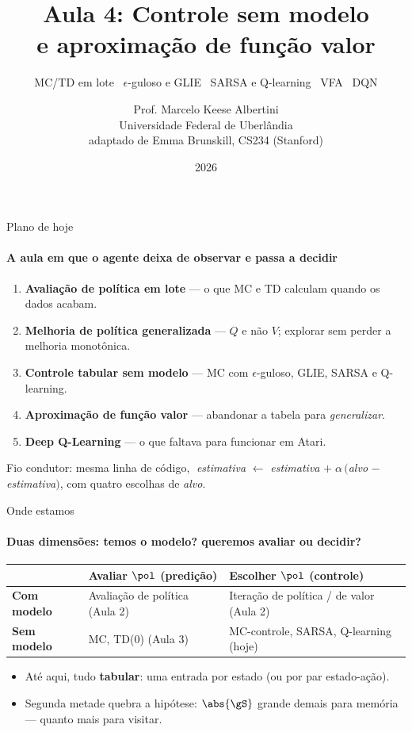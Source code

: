 \documentclass[aspectratio=169, 11pt]{beamer}
\title[Aula 4 — Controle sem modelo]{Aula 4: Controle sem modelo\\ e aproximação de função valor}
\subtitle[Aprendizagem por Reforço]{MC/TD em lote \textbullet\ $\epsilon$-guloso e GLIE \textbullet\ SARSA e Q-learning \textbullet\ VFA \textbullet\ DQN}
\author[Prof. Marcelo K. Albertini]{Prof. Marcelo Keese Albertini \\
  \footnotesize Universidade Federal de Uberlândia \\
  \footnotesize adaptado de Emma Brunskill, CS234 (Stanford)}
\institute{Universidade Federal de Uberlândia}
\date{2026}
\begin{document}
\begin{frame}\titlepage\end{frame}

\begin{frame}{Plano de hoje}
  \framesubtitle{A aula em que o agente deixa de observar e passa a decidir}

  \begin{enumerate}\setlength{\itemsep}{0.55ex}
    \item \textbf{Avaliação de política em lote} — o que MC e TD calculam
      quando os dados acabam.
    \item \textbf{Melhoria de política generalizada} — $Q$ e não $V$;
      explorar sem perder a melhoria monotônica.
    \item \textbf{Controle tabular sem modelo} — MC com $\epsilon$-guloso,
      GLIE, SARSA e Q-learning.
    \item \textbf{Aproximação de função valor} — abandonar a tabela para
      \emph{generalizar}.
    \item \textbf{Deep Q-Learning} — o que faltava para funcionar em Atari.
  \end{enumerate}

  \begin{ideiabox}
    Fio condutor: mesma linha de código,
    $\;$\emph{estimativa} $\leftarrow$ \emph{estimativa} $+\;\alpha\,($\emph{alvo} $-$ \emph{estimativa}$)$,
    com quatro escolhas de \emph{alvo}.
  \end{ideiabox}
\end{frame}

\begin{frame}{Onde estamos}
  \framesubtitle{Duas dimensões: temos o modelo? queremos avaliar ou decidir?}

  \begin{center}\small
  \begin{tabular}{lll}
    \toprule
     & \textbf{Avaliar $\pol$} (predição) & \textbf{Escolher $\pol$} (controle) \\
    \midrule
    \textbf{Com modelo} & Avaliação de política (Aula 2) & Iteração de política / de valor (Aula 2) \\
    \addlinespace[0.3ex]
    \textbf{Sem modelo} & MC, TD(0) (Aula 3) & \alert{MC-controle, SARSA, Q-learning (hoje)} \\
    \bottomrule
  \end{tabular}
  \end{center}

  \medskip
  \begin{itemize}\setlength{\itemsep}{0.3ex}
    \item Até aqui, tudo \textbf{tabular}: uma entrada por estado
      (ou por par estado-ação).
    \item Segunda metade quebra a hipótese: $\abs{\gS}$ grande demais para
      memória — quanto mais para visitar.
  \end{itemize}
\end{frame}
\end{document}
